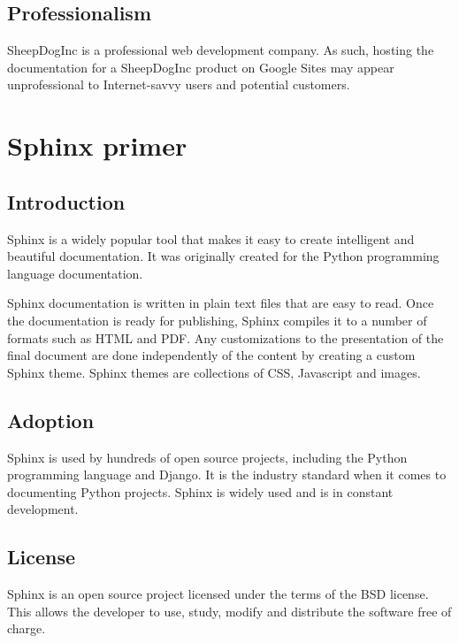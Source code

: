 \documentclass[letterpaper]{report}
\begin{document}
    \subsection*{Professionalism}

        SheepDogInc is a professional web development company. As such, hosting
        the documentation for a SheepDogInc product on Google Sites may appear
        unprofessional to Internet-savvy users and potential customers.

\section*{Sphinx primer}

    \subsection*{Introduction}

        Sphinx is a widely popular tool that makes it easy to create
        intelligent and beautiful documentation. It was originally created for
        the Python programming language documentation.

        Sphinx documentation is written in plain text files that are easy to
        read. Once the documentation is ready for publishing, Sphinx compiles
        it to a number of formats such as HTML and PDF. Any customizations to
        the presentation of the final document are done independently of the
        content by creating a custom Sphinx theme. Sphinx themes are
        collections of CSS, Javascript and images.

    \subsection*{Adoption}

        Sphinx is used by hundreds of open source projects, including the
        Python programming language and  Django. It is the industry standard
        when it comes to documenting Python projects. Sphinx is widely used and
        is in constant development.

    \subsection*{License}

        Sphinx is an open source project licensed under the terms of the BSD
        license. This allows the developer to use, study, modify and distribute
        the software free of charge.
\end{document}
